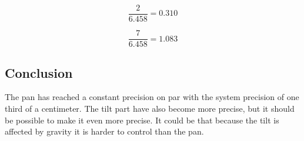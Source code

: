 \[ \frac{2}{6.458} = 0.310 \]

\[ \frac{7}{6.458} = 1.083 \]

\subsection*{Conclusion}
The pan has reached a constant precision on par with the system precision
of one third of a centimeter. The tilt part have also become more precise, but
it should be possible to make it even more precise. It could be that because the
tilt is affected by gravity it is harder to control than the pan.


